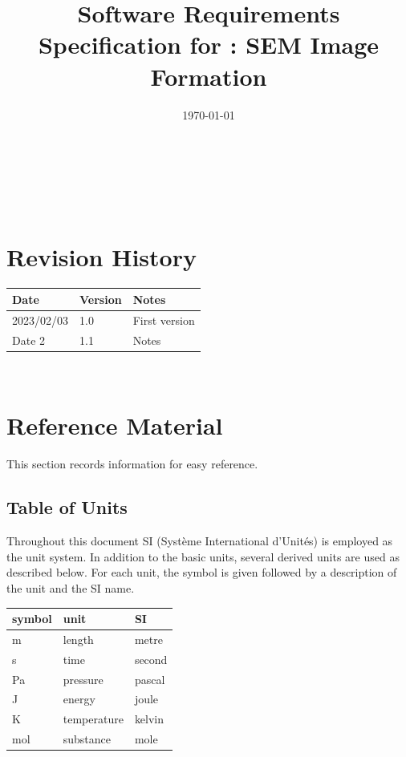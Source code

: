 \documentclass[12pt]{article}
\begin{document}
\title{Software Requirements Specification for \progname: SEM Image Formation} 
\author{\authname}
\date{\today}
	
\maketitle

~\newpage


\tableofcontents

~\newpage

\section*{Revision History}

\begin{tabularx}{\textwidth}{p{3cm}p{2cm}X}
\toprule {\bf Date} & {\bf Version} & {\bf Notes}\\
\midrule
2023/02/03 & 1.0 & First version\\
Date 2 & 1.1 & Notes\\
\bottomrule
\end{tabularx}

~\newpage

\section{Reference Material}

This section records information for easy reference.

\subsection{Table of Units}

Throughout this document SI (Syst\`{e}me International d'Unit\'{e}s) is employed
as the unit system.  In addition to the basic units, several derived units are
used as described below.  For each unit, the symbol is given followed by a
description of the unit and the SI name.
~\newline

\renewcommand{\arraystretch}{1.2}
  \noindent \begin{tabular}{l l l} 
    \toprule		
    \textbf{symbol} & \textbf{unit} & \textbf{SI}\\
    \midrule 
    \si{\metre} & length & metre\\
    \si{\second} & time & second\\
    \si{Pa} & pressure & pascal\\
    \si{J} & energy & joule\\
    \si{K} & temperature & kelvin\\
    \si{mol} & substance & mole\\
    \bottomrule
  \end{tabular}
~\newline
 
\end{document}
